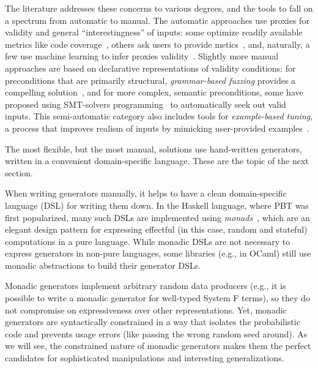 The literature addresses these concerns to various degrees, and the tools to
fall on a spectrum from automatic to manual. The automatic approaches use
proxies for validity and general ``interestingness'' of inputs: some optimize
readily available metrics like code coverage~\cite{afl-readme}, others ask users
to provide metics~\cite{loscher2017targetedpbt}, and, naturally, a few use
machine learning to infer proxies validity~\cite{godefroid2017learn,
DBLP:conf/icse/ReddyLPS20}. Slightly more manual approaches are based on
declarative representations of validity conditions: for preconditions that are
primarily structural, {\em grammar-based fuzzing} provides a compelling
solution~\cite{godefroid2008grammar, holler2012fuzzing, veggalam2016ifuzzer,
wang2019superion, srivastava2021gramatron}, and for more complex, semantic
preconditions, some have proposed using SMT-solvers
programming~\cite{dewey2017automated, LuckPOPL, steinhofel2022input} to
automatically seek out valid inputs. This semi-automatic category also includes
tools for {\em example-based tuning}, a process that improves realism of inputs
by mimicking user-provided examples~\cite{soremekun2020inputs}.

The most flexible, but the most manual, solutions use hand-written generators,
written in a convenient domain-specific language. These are the topic of the
next section.

When writing generators manually, it helps to have a clean domain-specific
language (DSL) for writing them down. In the Haskell language, where PBT was
first popularized, many such DSLs are implemented using {\em
monads\/}~\cite{moggi1991notions}, which are an elegant design pattern for
expressing effectful (in this case, random and stateful) computations in a pure
language. While monadic DSLs are not necessary to express generators in non-pure
languages, some libraries (e.g., in OCaml) still use monadic abstractions to
build their generator DSLs.

Monadic generators implement arbitrary random data producers (e.g., it is
possible to write a monadic generator for well-typed System F terms), so they do
not compromise on expressiveness over other representations. Yet, monadic
generators are syntactically constrained in a way that isolates the
probabilistic code and prevents usage errors (like passing the wrong random seed
around). As we will see, the constrained nature of monadic generators makes them
the perfect candidates for sophisticated manipulations and interesting
generalizations.

